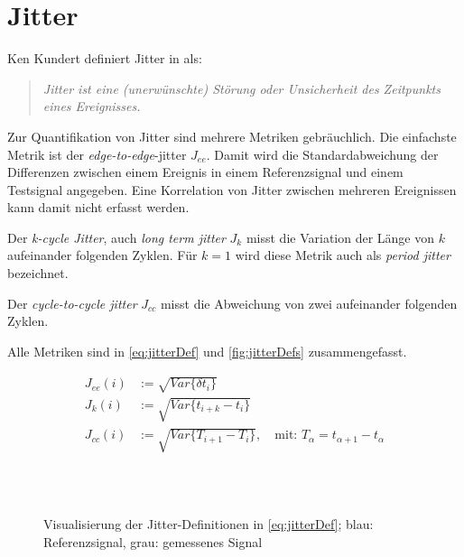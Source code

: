 \section{Jitter}
Ken Kundert definiert Jitter in \cite{Kundert2012} als:
\begin{quote}
	\textit{Jitter ist eine (unerwünschte) Störung oder Unsicherheit des Zeitpunkts eines Ereignisses. }
\end{quote}

Zur Quantifikation von Jitter sind mehrere Metriken gebräuchlich. Die einfachste Metrik ist der \textit{edge-to-edge}-jitter $J_{ee}$. Damit wird die Standardabweichung der Differenzen zwischen einem Ereignis in einem Referenzsignal und einem Testsignal angegeben. Eine Korrelation von Jitter zwischen mehreren Ereignissen kann damit nicht erfasst werden.

Der \textit{k-cycle Jitter}, auch \textit{long term jitter} $J_k$ misst die Variation der Länge von $k$ aufeinander folgenden Zyklen. Für $k=1$ wird diese Metrik auch als \textit{period jitter} bezeichnet.

Der \textit{cycle-to-cycle jitter} $J_{cc}$ misst die Abweichung von zwei aufeinander folgenden Zyklen.

Alle Metriken sind in \autoref{eq:jitterDef} und \autoref{fig:jitterDefs} zusammengefasst.

\begin{subequations}
	\label{eq:jitterDef}
	\begin{align}
	J_{ee}(i)&:=\sqrt{Var\{\delta t_i\}} \\
	J_k(i)&:=\sqrt{Var\{t_{i+k}-t_i\}} \\
	J_{cc}(i)&:=\sqrt{Var\{T_{i+1}-T_i\}}, \quad \text{mit: } T_\alpha=t_{\alpha+1}-t_\alpha
	\end{align}
\end{subequations}

\begin{figure}[H]
	\centering
	\\[4ex]
	\\[4ex]
	\caption[Jitterdefinitionen]{Visualisierung der Jitter-Definitionen in \autoref{eq:jitterDef}; blau: Referenzsignal, grau: gemessenes Signal}
	\label{fig:jitterDefs}
\end{figure}

